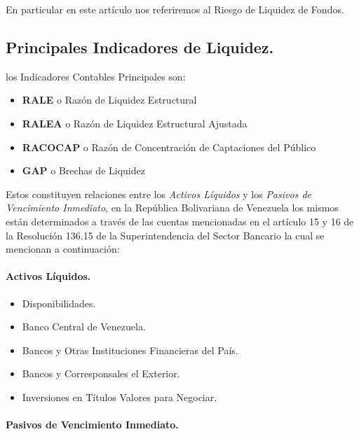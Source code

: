 \documentclass[10pt,]{article}
\providecommand{\tightlist}{%
  \setlength{\itemsep}{0pt}\setlength{\parskip}{0pt}}
\begin{document}
En particular en este artículo nos referiremos al Riesgo de Liquidez de
Fondos.

\hypertarget{principales-indicadores-de-liquidez.}{%
\subsection{\texorpdfstring{\textbf{Principales Indicadores de
Liquidez.}}{Principales Indicadores de Liquidez.}}\label{principales-indicadores-de-liquidez.}}

los Indicadores Contables Principales son:

\begin{itemize}
\tightlist
\item
  \textbf{RALE} o Razón de Liquidez Estructural
\item
  \textbf{RALEA} o Razón de Liquidez Estructural Ajustada\\
\item
  \textbf{RACOCAP} o Razón de Concentración de Captaciones del Público
\item
  \textbf{GAP} o Brechas de Liquidez
\end{itemize}

Estos constituyen relaciones entre los \emph{Activos Líquidos} y los
\emph{Pasivos de Vencimiento Inmediato}, en la República Bolivariana de
Venezuela los mismos están determinados a través de las cuentas
mencionadas en el artículo 15 y 16 de la Resolución 136.15 de la
Superintendencia del Sector Bancario la cual se mencionan a
continuación:

\hypertarget{activos-liquidos.}{%
\paragraph{Activos Líquidos.}\label{activos-liquidos.}}

\begin{itemize}
\tightlist
\item
  Disponibilidades.\\
\item
  Banco Central de Venezuela.\\
\item
  Bancos y Otras Instituciones Financieras del País.
\item
  Bancos y Corresponsales el Exterior.
\item
  Inversiones en Títulos Valores para Negociar.
\end{itemize}

\hypertarget{pasivos-de-vencimiento-inmediato.}{%
\paragraph{Pasivos de Vencimiento
Inmediato.}\label{pasivos-de-vencimiento-inmediato.}}
\end{document}
